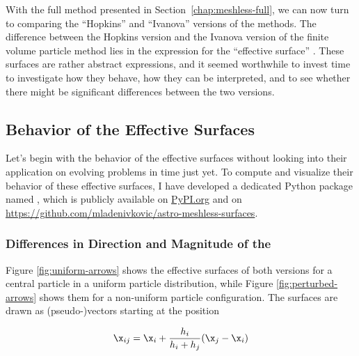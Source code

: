 With the full method presented in Section~\ref{chap:meshless-full}, we can now turn to comparing
the ``Hopkins'' and ``Ivanova'' versions of the methods.
The difference between the Hopkins version and the Ivanova version of the finite volume particle
method lies in the expression for the ``effective surface'' \Aij. These surfaces are rather abstract expressions, and it seemed worthwhile to invest time to investigate how they behave, how they can be interpreted, and to see whether there might be significant differences between the two versions.












\subsection{Behavior of the Effective Surfaces}

Let's begin with the behavior of the effective surfaces without looking into their application on
evolving problems in time just yet. To compute and visualize their behavior of these effective
surfaces, I have developed a dedicated Python package named \mbox{},
which is publicly available on
\href{https://github.com/mladenivkovic/astro-meshless-surfaces}{PyPI.org} and on
\url{https://github.com/mladenivkovic/astro-meshless-surfaces}.




\subsubsection{Differences in Direction and Magnitude of the \Aij}

Figure \ref{fig:uniform-arrows} shows the effective surfaces of both versions for a central
particle in a uniform particle distribution, while Figure \ref{fig:perturbed-arrows} shows them for
a non-uniform particle configuration. The surfaces are drawn as (pseudo-)vectors starting at the
position

\begin{equation}
	\x_{ij} = \x_i + \frac{h_i}{h_i + h_j}(\x_j - \x_i)		\label{eq:xij}
\end{equation}

